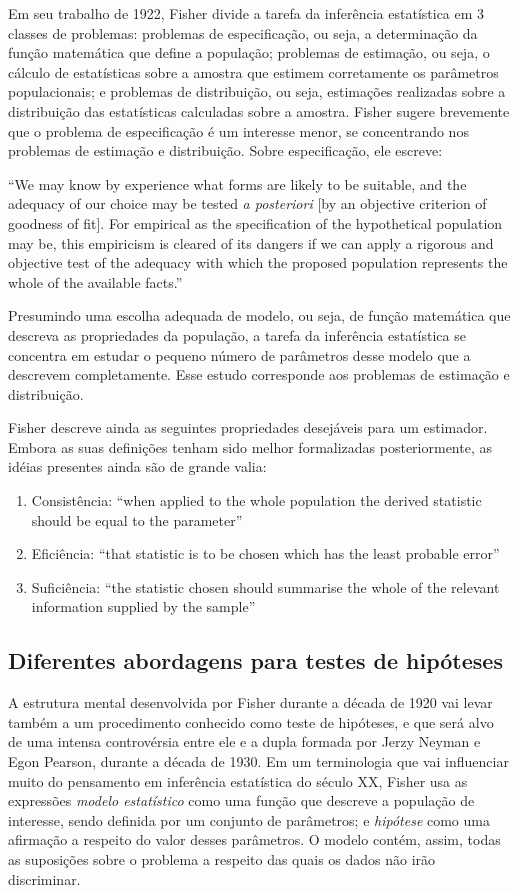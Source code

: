 \documentclass[12pt,a4paper]{article}
\begin{document}
Em seu trabalho de 1922, Fisher divide a tarefa da inferência estatística em 3 classes de 
problemas: problemas de especificação, ou seja, a determinação da função
matemática que define a população; problemas de estimação, ou seja, o cálculo de estatísticas sobre a amostra que estimem 
corretamente os parâmetros populacionais; e problemas de distribuição, ou seja, estimações realizadas sobre a distribuição
das estatísticas calculadas sobre a amostra. Fisher sugere brevemente que o problema de especificação é um interesse menor,
se concentrando nos problemas de estimação e distribuição. Sobre especificação, ele escreve:

``We may know by experience what forms are likely to be suitable, and the adequacy of our choice may be
tested {\em a posteriori} [by an objective criterion of goodness of fit].
For empirical as the specification of the hypothetical population may be, this empiricism is cleared of its dangers if
we can apply a rigorous and objective test of the adequacy with which the proposed population represents the whole of
the available facts.''\cite{Fisher1922}

Presumindo uma escolha adequada de modelo, ou seja,	de função matemática que descreva as propriedades da população,
a tarefa da inferência estatística se concentra em estudar o pequeno número de parâmetros desse modelo que a descrevem
completamente. Esse estudo corresponde aos problemas de estimação e distribuição.

Fisher descreve ainda as seguintes propriedades desejáveis para um estimador. Embora as suas definições tenham sido
melhor formalizadas posteriormente, as idéias presentes ainda são de grande valia:
\begin{enumerate}
	\item Consistência: ``when applied to the whole population the derived statistic should be equal to the parameter''
	\item Eficiência: ``that statistic is to be chosen which has the least probable error''
	\item Suficiência: ``the statistic chosen should summarise the whole of the relevant information supplied by the sample''
\end{enumerate}

\subsection{Diferentes abordagens para testes de hipóteses}

A estrutura mental desenvolvida por Fisher durante a década de 1920 vai levar também a um procedimento conhecido como teste de 
hipóteses, e que será alvo de uma intensa controvérsia entre ele e a dupla formada por Jerzy Neyman e Egon Pearson, 
durante a década de 1930. Em um terminologia que vai influenciar muito do pensamento em inferência estatística do século XX,
Fisher usa as expressões {\em modelo estatístico} como uma função que descreve a população de interesse, sendo definida 
por um conjunto de parâmetros; e {\em hipótese} como uma afirmação a respeito do valor desses parâmetros. O modelo contém, 
assim, todas as suposições sobre o problema a respeito das quais os dados não irão discriminar.
\end{document}
